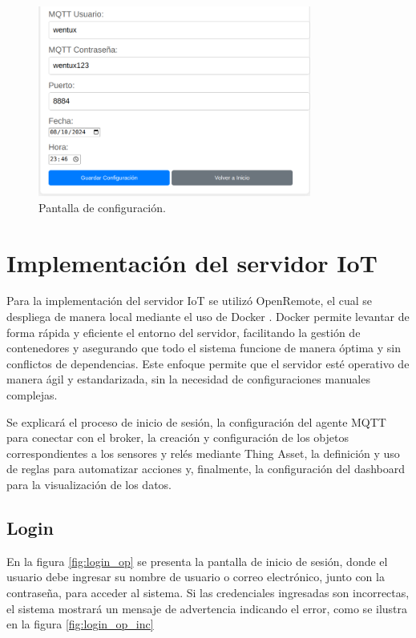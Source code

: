 \begin{figure}[H]
\centering 
\includegraphics[width=0.8\textwidth]{./Figures/config_2.png}
\caption{Pantalla de configuración.}
\label{fig:config_2}
\end{figure}





\section{Implementación del servidor IoT}


Para la implementación del servidor IoT se utilizó OpenRemote, el cual se despliega de manera local mediante el uso de Docker \citep{docker}. Docker permite levantar de forma rápida y eficiente el entorno del servidor, facilitando la gestión de contenedores y asegurando que todo el sistema funcione de manera óptima y sin conflictos de dependencias. Este enfoque permite que el servidor esté operativo de manera ágil y estandarizada, sin la necesidad de configuraciones manuales complejas.

Se explicará el proceso de inicio de sesión, la configuración del agente MQTT para conectar con el broker, la creación y configuración de los objetos correspondientes a los sensores y relés mediante Thing Asset, la definición y uso de reglas para automatizar acciones y, finalmente, la configuración del dashboard para la visualización de los datos.


\subsection{Login}

En la figura \ref{fig:login_op} se presenta la pantalla de inicio de sesión, donde el usuario debe ingresar su nombre de usuario o correo electrónico, junto con la contraseña, para acceder al sistema. Si las credenciales ingresadas son incorrectas, el sistema mostrará un mensaje de advertencia indicando el error, como se ilustra en la figura \ref{fig:login_op_inc}

